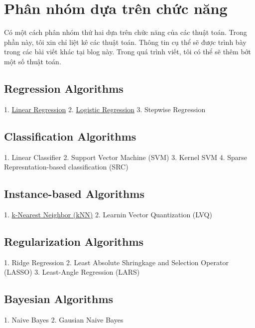  
 
\section{Phân nhóm dựa trên chức năng }
 
Có một cách phân nhóm thứ hai dựa trên chức năng của các thuật toán. Trong phần này, tôi xin chỉ liệt kê các thuật toán. Thông tin cụ thể sẽ được trình bày trong các bài viết khác tại blog này. Trong quá trình viết, tôi có thể sẽ thêm bớt một số thuật toán.  
 
 
\subsection{Regression Algorithms}
 
1. \href{http://machinelearningcoban.com/2016/12/28/linearregression/}{Linear Regression} 
2. \href{http://machinelearningcoban.com/2017/01/27/logisticregression/#sigmoid-function}{Logistic Regression} 
3. Stepwise Regression 
 
 
\subsection{Classification Algorithms }
 
1. Linear Classifier  
2. Support Vector Machine (SVM) 
3. Kernel SVM  
4. Sparse Represntation-based classification (SRC) 
 
 
\subsection{Instance-based Algorithms }
 
1. \href{http://machinelearningcoban.com/2017/01/08/knn/}{k-Nearest Neighbor (kNN)} 
2. Learnin Vector Quantization (LVQ) 
 
 
\subsection{Regularization Algorithms }
 
1. Ridge Regression  
2. Least Absolute Shringkage and Selection Operator (LASSO) 
3. Least-Angle Regression (LARS) 
 
 
\subsection{Bayesian Algorithms}
 
1. Naive Bayes 
2. Gausian Naive Bayes  
 
